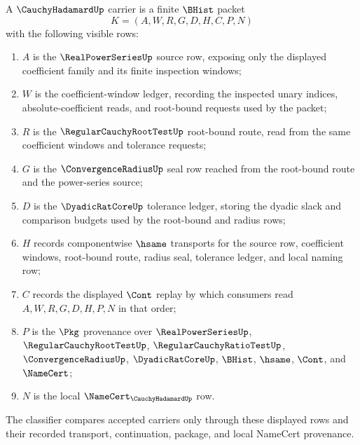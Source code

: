 \begin{definition}
\label{def:cauchy-hadamard-carrier}
A $\CauchyHadamardUp$ carrier is a finite $\BHist$ packet
$$
K=(A,W,R,G,D,H,C,P,N)
$$
with the following visible rows:
\begin{enumerate}
\item $A$ is the $\RealPowerSeriesUp$ source row, exposing only the displayed coefficient family and its finite inspection windows;
\item $W$ is the coefficient-window ledger, recording the inspected unary indices, absolute-coefficient reads, and root-bound requests used by the packet;
\item $R$ is the $\RegularCauchyRootTestUp$ root-bound route, read from the same coefficient windows and tolerance requests;
\item $G$ is the $\ConvergenceRadiusUp$ seal row reached from the root-bound route and the power-series source;
\item $D$ is the $\DyadicRatCoreUp$ tolerance ledger, storing the dyadic slack and comparison budgets used by the root-bound and radius rows;
\item $H$ records componentwise $\hsame$ transports for the source row, coefficient windows, root-bound route, radius seal, tolerance ledger, and local naming row;
\item $C$ records the displayed $\Cont$ replay by which consumers read $A,W,R,G,D,H,P,N$ in that order;
\item $P$ is the $\Pkg$ provenance over $\RealPowerSeriesUp$, $\RegularCauchyRootTestUp$, $\RegularCauchyRatioTestUp$, $\ConvergenceRadiusUp$, $\DyadicRatCoreUp$, $\BHist$, $\hsame$, $\Cont$, and $\NameCert$;
\item $N$ is the local $\NameCert_{\CauchyHadamardUp}$ row.
\end{enumerate}
The classifier compares accepted carriers only through these displayed rows and their recorded transport, continuation, package, and local NameCert provenance.
\end{definition}

